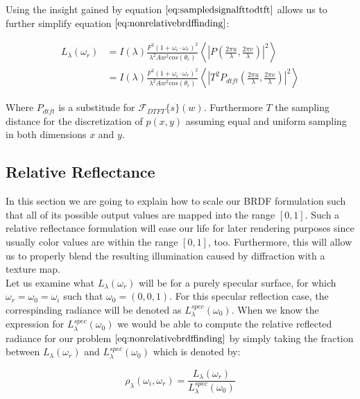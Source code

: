 Using the insight gained by equation $\ref{eq:sampledsignalfttodtft}$ allows us to further simplify equation $\ref{eq:nonrelativebrdffinding}$:

\begin{align}
L_{\lambda}(\omega_r) 
& = I(\lambda) \frac{F^2 (1 + \omega_i \cdot \omega_r)^2}{\lambda^2 A w^2 cos(\theta_r)} \left \langle \left|P \left( \frac{2\pi u}{\lambda}, \frac{2\pi v}{\lambda}\right) \right|^2 \right \rangle \nonumber \\
& = I(\lambda) \frac{F^2 (1 + \omega_i \cdot \omega_r)^2}{\lambda^2 A w^2 cos(\theta_r)} \left \langle \left|T^2 P_{dtft}\left( \frac{2\pi u}{\lambda}, \frac{2\pi v}{\lambda}\right) \right|^2 \right \rangle
\label{eq:nonrelativebrdffindingreproddtft}
\end{align}

Where $P_{dtft}$ is a substitude for $\mathcal{F}_{DTFT}\{s\}(w)$. Furthermore $T$ the sampling distance for the discretization of $p(x,y)$ assuming equal and uniform sampling in both dimensions $x$ and $y$.

\subsection{Relative Reflectance}
In this section we are going to explain how to scale our BRDF formulation such that all of its possible output values are mapped into the range $\left[0,1\right]$. Such a relative reflectance formulation will ease our life for later rendering purposes since usually color values are within the range $\left[0,1\right]$, too. Furthermore, this will allow us to properly blend the resulting illumination caused by diffraction with a texture map. \\

Let us examine what $L_\lambda(\omega_r)$ will be for a purely specular surface, for which $\omega_r = \omega_0 = \omega_i$ such that $\omega_0 = (0,0,1)$. For this specular reflection case, the correspinding radiance will be denoted as $L_\lambda^{spec}(\omega_0)$. When we know the expression for $L_\lambda^{spec}(\omega_0)$ we would be able to compute the relative reflected radiance for our problem $\ref{eq:nonrelativebrdffinding}$ by simply taking the fraction between $L_\lambda(\omega_r)$ and $L_\lambda^{spec}(\omega_0)$ which is denoted by: 

\begin{equation}
  \rho_\lambda(\omega_i,\omega_r) = \frac{L_\lambda(\omega_r)}{L_\lambda^{spec}(\omega_0)}
  \label{eq:rohrel}
\end{equation}

